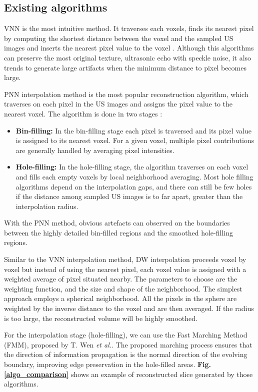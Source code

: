 \documentclass[12pt,journal,compsoc]{IEEEtran}
\begin{document}
\subsection{Existing algorithms}

VNN is the most intuitive method. It traverses each voxels, finds its nearest pixel by computing the shortest distance between the voxel and the sampled US images and inserts the nearest pixel value to the voxel \cite{13}.
Although this algorithms can preserve the most original texture, ultrasonic echo with speckle noise, it also trends to generate large artifacts when the minimum distance to pixel becomes large.\par

PNN interpolation method is the most popular reconstruction algorithm, which traverses on each pixel in the US images and assigns the pixel value to the nearest voxel.
The algorithm is done in two stages :
\begin{itemize}
	\item \textbf{Bin-filling:} In the bin-filling stage each pixel is traversed and its pixel value is assigned to its nearest voxel. For a given voxel, multiple pixel contributions are generally handled by averaging pixel intensities.  
	\item \textbf{Hole-filling:} In the hole-filling stage, the algorithm traverses on each voxel and fills each empty voxels by local neighborhood averaging. Most hole filling algorithms depend on the interpolation gaps, and there can still be few holes if the distance among sampled US images is to far apart, greater than the interpolation radius. 
\end{itemize}
With the PNN method, obvious artefacts can observed on the boundaries between the highly detailed bin-filled regions and the smoothed hole-filling regions.\par

Similar to the VNN interpolation method, DW interpolation proceeds voxel by voxel but instead of using the nearest pixel, each voxel value is assigned with a weighted average of pixel situated nearby. The parameters to choose are the weighting function, and the size and shape of the neighborhood. The simplest approach employs a spherical neighborhood. All the pixels in the sphere are weighted by the inverse distance to the voxel and are then averaged. If the radius is too large, the reconstructed volume will be highly smoothed.

For the interpolation stage (hole-filling), we can use the Fast Marching Method (FMM), proposed by T. Wen \textit{et al.}\cite{2}. The proposed marching process ensures that the direction of information propagation is the normal direction of the evolving boundary, improving edge preservation in the hole-filled areas.
\textbf{Fig.\ref{algo_comparison}} shows an example of reconstructed slice generated by those algorithms.
\end{document}
